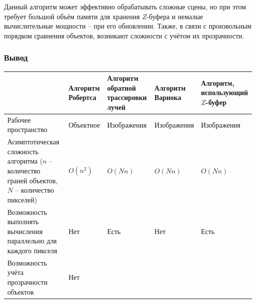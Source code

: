 Данный алгоритм может эффективно обрабатывать сложные сцены, но при этом
требует большой объём памяти для хранения $Z$-буфера и немалые вычислительные
мощности -- при его обновлении. Также, в связи с произвольным порядком
сравнения объектов, возникают сложности с учётом их прозрачности.

\subsubsection{Вывод}

\noindent
\begin{adjustbox}{width=1\textwidth}
    \begin{tabular}{|p{}|p{}|p{}|p{}|p{}|}
        \hline
        &
        Алгоритм Робертса
        &
        Алгоритм обратной трассировки лучей
        &
        Алгоритм Варнока
        &
        Алгоритм, использующий $Z$-буфер
        \\
        \hline
        Рабочее пространство
        &
        Объектное
        &
        Изображения
        &
        Изображения
        &
        Изображения
        \\
        \hline
        Асимптотическая сложность алгоритма ($n$ -- количество граней объектов,
        $N$ -- количество пикселей)
        &
        \cellcolor{yellow!10}
        $O(n^2)$
        &
        \cellcolor{yellow!10}
        $O(Nn)$
        &
        \cellcolor{yellow!10}
        $O(Nn)$
        &
        \cellcolor{yellow!10}
        $O(Nn)$
        \\
        \hline
        Возможность выполнять вычисления параллельно для каждого пикселя
        &
        \cellcolor{red!10}
        Нет
        &
        \cellcolor{green!10}
        Есть
        &
        \cellcolor{red!10}
        Нет
        &
        \cellcolor{green!10}
        Есть
        \\
        \hline
        Возможность учёта прозрачности объектов
        &
        \cellcolor{red!10}
        Нет
        &

\end{tabular}
\end{adjustbox}
